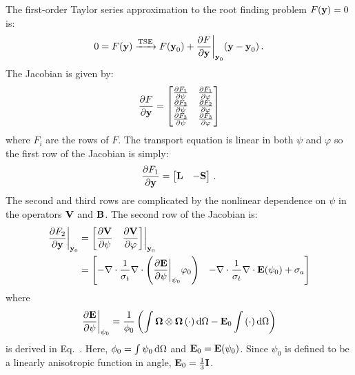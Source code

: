 \documentclass[../doc.tex]{subfiles}
\begin{document}
The first-order Taylor series approximation to the root finding problem $F(\boldsymbol{\mathrm{y}}) = 0$ is: 
	\begin{equation} \label{smm:smm_root}
		0 = F(\boldsymbol{\mathrm{y}}) \xrightarrow{\text{TSE}} F(\boldsymbol{\mathrm{y}}_0) + \frac{\partial F}{\partial \boldsymbol{\mathrm{y}}}\biggr\rvert_{\boldsymbol{\mathrm{y}}_0}(\boldsymbol{\mathrm{y}} - \boldsymbol{\mathrm{y}}_0) \,. 
	\end{equation}
The Jacobian is given by: 
	\begin{equation}
		\frac{\partial F}{\partial \boldsymbol{\mathrm{y}}} = \begin{bmatrix} 
			\frac{\partial F_1}{\partial \psi} & \frac{\partial F_1}{\partial \varphi} \\ 
			\frac{\partial F_2}{\partial \psi} & \frac{\partial F_2}{\partial \varphi} \\ 
			\frac{\partial F_3}{\partial \psi} & \frac{\partial F_3}{\partial \varphi} 
		\end{bmatrix} 
	\end{equation}
where $F_i$ are the rows of $F$. The transport equation is linear in both $\psi$ and $\varphi$ so the first row of the Jacobian is simply: 
	\begin{equation}
		\frac{\partial F_1}{\partial \boldsymbol{\mathrm{y}}} = \begin{bmatrix} 
			\boldsymbol{\mathrm{L}} & -\boldsymbol{\mathrm{S}} 
		\end{bmatrix} \,. 
	\end{equation}
The second and third rows are complicated by the nonlinear dependence on $\psi$ in the operators $\boldsymbol{\mathrm{V}}$ and $\boldsymbol{\mathrm{B}}$. The second row of the Jacobian is: 
	\begin{equation}
	\begin{aligned}
		\frac{\partial F_2}{\partial \boldsymbol{\mathrm{y}}}\biggr\rvert_{\boldsymbol{\mathrm{y}}_0} &= \begin{bmatrix} 
			\displaystyle\frac{\partial \boldsymbol{\mathrm{V}}}{\partial \psi} & \displaystyle\frac{\partial \boldsymbol{\mathrm{V}}}{\partial \varphi} 
		\end{bmatrix} \biggr\rvert_{\boldsymbol{\mathrm{y}}_0} \\
		&= \begin{bmatrix} 
			\displaystyle-\nabla\cdot\frac{1}{\sigma_t}\nabla\cdot\left( \frac{\partial \boldsymbol{\mathrm{E}}}{\partial \psi}\biggr\rvert_{\psi_0}\varphi_0 \right) & 
			\displaystyle-\nabla\cdot\frac{1}{\sigma_t}\nabla\cdot\boldsymbol{\mathrm{E}}(\psi_0) + \sigma_a 
		\end{bmatrix} 
	\end{aligned}
	\end{equation}
where 
	\begin{equation}
	 	\frac{\partial \boldsymbol{\mathrm{E}}}{\partial \psi}\biggr\rvert_{\psi_0} = \frac{1}{\phi_0}\left( \int \boldsymbol{\Omega}\otimes\boldsymbol{\Omega}\left( \cdot \right)\mathop{}\!\mathrm{d}\Omega - \boldsymbol{\mathrm{E}}_0\int \left( \cdot \right)\mathop{}\!\mathrm{d}\Omega \right)
	\end{equation} 
is derived in Eq.~. Here, $\phi_0 = \int \psi_0 \mathop{}\!\mathrm{d} \Omega$ and $\boldsymbol{\mathrm{E}}_0 = \boldsymbol{\mathrm{E}}(\psi_0)$. Since $\psi_0$ is defined to be a linearly anisotropic function in angle, $\boldsymbol{\mathrm{E}}_0 = \frac{1}{3}\boldsymbol{\mathrm{I}}$. 
\end{document}
